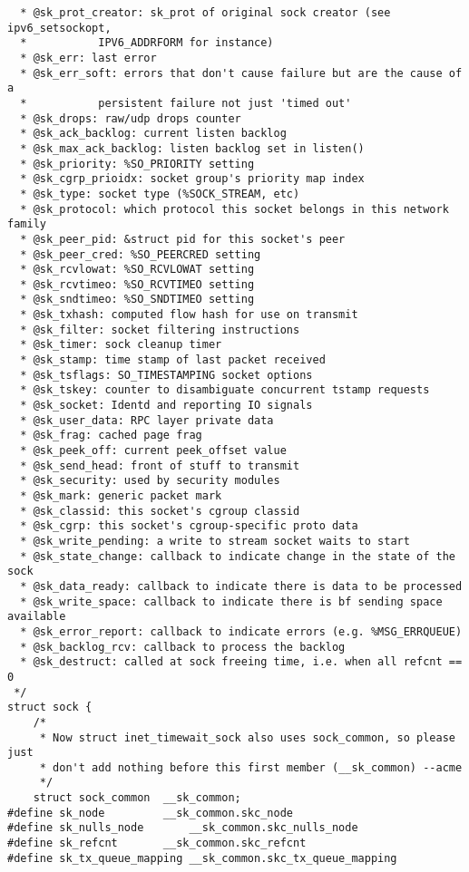 \begin{verbatim}
  * @sk_prot_creator: sk_prot of original sock creator (see ipv6_setsockopt,
  *           IPV6_ADDRFORM for instance)
  * @sk_err: last error
  * @sk_err_soft: errors that don't cause failure but are the cause of a
  *           persistent failure not just 'timed out'
  * @sk_drops: raw/udp drops counter
  * @sk_ack_backlog: current listen backlog
  * @sk_max_ack_backlog: listen backlog set in listen()
  * @sk_priority: %SO_PRIORITY setting
  * @sk_cgrp_prioidx: socket group's priority map index
  * @sk_type: socket type (%SOCK_STREAM, etc)
  * @sk_protocol: which protocol this socket belongs in this network family
  * @sk_peer_pid: &struct pid for this socket's peer
  * @sk_peer_cred: %SO_PEERCRED setting
  * @sk_rcvlowat: %SO_RCVLOWAT setting
  * @sk_rcvtimeo: %SO_RCVTIMEO setting
  * @sk_sndtimeo: %SO_SNDTIMEO setting
  * @sk_txhash: computed flow hash for use on transmit
  * @sk_filter: socket filtering instructions
  * @sk_timer: sock cleanup timer
  * @sk_stamp: time stamp of last packet received
  * @sk_tsflags: SO_TIMESTAMPING socket options
  * @sk_tskey: counter to disambiguate concurrent tstamp requests
  * @sk_socket: Identd and reporting IO signals
  * @sk_user_data: RPC layer private data
  * @sk_frag: cached page frag
  * @sk_peek_off: current peek_offset value
  * @sk_send_head: front of stuff to transmit
  * @sk_security: used by security modules
  * @sk_mark: generic packet mark
  * @sk_classid: this socket's cgroup classid
  * @sk_cgrp: this socket's cgroup-specific proto data
  * @sk_write_pending: a write to stream socket waits to start
  * @sk_state_change: callback to indicate change in the state of the sock
  * @sk_data_ready: callback to indicate there is data to be processed
  * @sk_write_space: callback to indicate there is bf sending space available
  * @sk_error_report: callback to indicate errors (e.g. %MSG_ERRQUEUE)
  * @sk_backlog_rcv: callback to process the backlog
  * @sk_destruct: called at sock freeing time, i.e. when all refcnt == 0
 */
struct sock {
    /*
     * Now struct inet_timewait_sock also uses sock_common, so please just
     * don't add nothing before this first member (__sk_common) --acme
     */
    struct sock_common  __sk_common;
#define sk_node         __sk_common.skc_node
#define sk_nulls_node       __sk_common.skc_nulls_node
#define sk_refcnt       __sk_common.skc_refcnt
#define sk_tx_queue_mapping __sk_common.skc_tx_queue_mapping


\end{verbatim}
